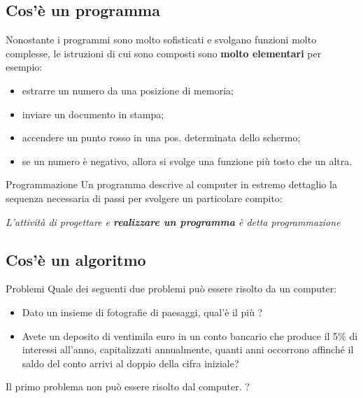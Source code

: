 \subsection{Cos'è un programma}
\begin{frame}
\begin{block}{}
Nonostante i programmi sono molto sofisticati e svolgano funzioni molto complesse, le 
istruzioni di cui sono composti sono \textbf{molto elementari} per esempio:
\begin{itemize}
\item estrarre un numero da una posizione di memoria;
\item inviare un documento in stampa;
\item accendere un punto rosso in una pos. determinata dello schermo;
\item se un numero è negativo, allora si svolge una funzione più tosto che un altra.
\end{itemize}
\end{block}
\begin{block}{Programmazione}
Un programma descrive al computer in estremo dettaglio la sequenza necessaria di 
passi per svolgere un particolare compito:
\begin{center}
\itshape{L'attività di progettare e \textbf{realizzare un programma} è detta \alert{programmazione}}
\end{center}
\end{block}
\end{frame}

\subsection{Cos'è un algoritmo}
\begin{frame}
\begin{block}{Problemi}
Quale dei seguenti due problemi può essere risolto da un computer:
\begin{itemize}
\item Dato un insieme di fotografie di paesaggi, qual'è il più ?
\item Avete un deposito di ventimila euro in un conto bancario che produce il 5\%
di interessi all'anno, capitalizzati annualmente, quanti anni occorrono affinché 
il saldo del conto arrivi al doppio della cifra iniziale?
\end{itemize}
\end{block}
\pause
\begin{block}{}
Il primo problema non può essere risolto dal computer. \textbf{}?
\end{block}
\end{frame}

